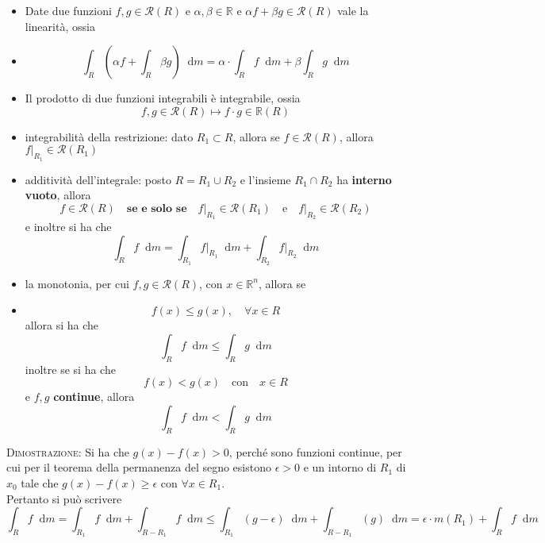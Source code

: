 \documentclass[a4paper]{extarticle}
\newcommand*\dif{\mathop{}\!\mathrm{d}}
\begin{document}
\begin{itemize}
    \item Date due funzioni $f,g \in \mathcal{R}(R)$ e $\alpha, \beta \in \mathbb{R}$ e $\alpha f + \beta g \in \mathcal{R}(R)$ vale la linearità, ossia
    \item \[\int_R (\alpha f + \int_R \beta g) \dif m = \alpha \cdot \int_R f \dif m + \beta \int_R g \dif m\]

    \item Il prodotto di due funzioni integrabili è integrabile, ossia
    \[f,g \in \mathcal{R}(R) \longmapsto f \cdot g \in \mathbb{R}(R)\]

    \item integrabilità della restrizione: dato $R_1 \subset R$, allora se $f \in \mathcal{R}(R)$, allora $f \vert_{R_1} \in \mathcal{R}(R_1)$

    \item additività dell'integrale: posto $R = R_1 \cup R_2$ e l'insieme $R_1 \cap R_2$ ha \textbf{interno vuoto}, allora
    \[f \in \mathcal{R}(R) \hspace{1em} \textbf{se e solo se} \hspace{1em} f \vert_{R_1} \in \mathcal{R}(R_1) \hspace{1em} \text{e} \hspace{1em} f \vert_{R_2} \in \mathcal{R}(R_2)\]
    e inoltre si ha che
    \[\int_{R} f \dif m = \int_{R_1} f \vert_{R_1} \dif m + \int_{R_2} f \vert_{R_2} \dif m\]

    \item la monotonia, per cui $f,g \in \mathcal{R}(R)$, con $x \in \mathbb{R}^n$, allora se
    \item \[f(x) \leq g(x), \hspace{1em} \forall x \in R\]
    allora si ha che
    \[\int_R f \dif m \leq \int_R g \dif m\]
    inoltre se si ha che
    \[f(x) < g(x) \hspace{1em} \text{con} \hspace{1em} x \in R\]
    e $f,g$ \textbf{continue}, allora
    \[\int_R f \dif m < \int_R g \dif m\]
\end{itemize}

\vspace{2em}
\noindent
\normalfont \normalsize
\textsc{Dimostrazione}: Si ha che $g(x) - f(x) > 0$, perché sono funzioni continue, per cui per il teorema della permanenza del segno esistono $\epsilon > 0$ e un intorno di $R_1$ di $x_0$ tale che $g(x)-f(x) \geq \epsilon$ con $\forall x \in R_1$.\\
Pertanto si può scrivere
\[\int_R f \dif m = \int_{R_1} f \dif m + \int_{R-R_1} f \dif m \leq \int_{R_1} (g-\epsilon) \dif m + \int_{R-R_1} (g) \dif m = \epsilon \cdot m(R_1) + \int_R f \dif m\]
\end{document}
